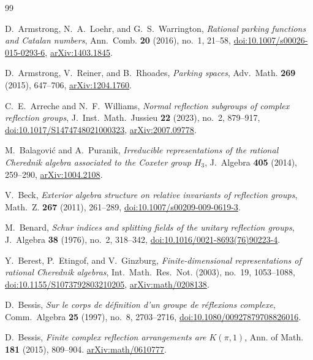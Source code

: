 \documentclass[10pt,a4paper]{amsart}
\theoremstyle{definition}
\begin{document}
\begingroup\raggedbottom
\begin{thebibliography}{99}
\raggedright
{}
D.~Armstrong, N.~A.~Loehr, and G.~S.~Warrington,
\emph{Rational parking functions and Catalan numbers},
Ann.~Comb. \textbf{20} (2016), no.~1, 21--58,
\href{https://doi.org/10.1007/s00026-015-0293-6}{doi:10.1007/s00026-015-0293-6},
\href{https://arxiv.org/abs/1403.1845}{arXiv:1403.1845}.

D.~Armstrong, V.~Reiner, and B.~Rhoades,
\emph{Parking spaces}, Adv.~Math. \textbf{269} (2015), 647--706,
\href{https://arxiv.org/abs/1204.1760}{arXiv:1204.1760}.

C.~E.~Arreche and N.~F.~Williams,
\emph{Normal reflection subgroups of complex reflection groups},
J.~Inst.~Math.~Jussieu \textbf{22} (2023), no.~2, 879--917,
\href{https://doi.org/10.1017/S1474748021000323}{doi:10.1017/S1474748021000323},
\href{https://arxiv.org/abs/2007.09778}{arXiv:2007.09778}.

M.~Balagovi\'c and A.~Puranik,
\emph{Irreducible representations of the rational Cherednik algebra
associated to the Coxeter group $H_3$},
J.~Algebra \textbf{405} (2014), 259--290,
\href{https://arxiv.org/abs/1004.2108}{arXiv:1004.2108}.

V.~Beck,
\emph{Exterior algebra structure on relative invariants of reflection groups},
Math.~Z. \textbf{267} (2011), 261--289,
\href{https://doi.org/10.1007/s00209-009-0619-3}{doi:10.1007/s00209-009-0619-3}.

M.~Benard,
\emph{Schur indices and splitting fields of the unitary reflection groups},
J.~Algebra \textbf{38} (1976), no.~2, 318--342,
\href{https://doi.org/10.1016/0021-8693(76)90223-4}{doi:10.1016/0021-8693(76)90223-4}.

Y.~Berest, P.~Etingof, and V.~Ginzburg,
\emph{Finite-dimensional representations of rational Cherednik algebras},
Int.~Math.~Res.~Not. (2003), no.~19, 1053--1088,
\href{https://doi.org/10.1155/S1073792803210205}{doi:10.1155/S1073792803210205},
\href{https://arxiv.org/abs/math/0208138}{arXiv:math/0208138}.

D.~Bessis,
\emph{Sur le corps de d\'efinition d'un groupe de r\'eflexions complexe},
Comm.~Algebra \textbf{25} (1997), no.~8, 2703--2716,
\href{https://doi.org/10.1080/00927879708826016}{doi:10.1080/00927879708826016}.

D.~Bessis,
\emph{Finite complex reflection arrangements are $K(\pi,1)$},
Ann. of Math. \textbf{181} (2015), 809--904.
\href{https://arxiv.org/abs/math/0610777}{arXiv:math/0610777}.


\end{thebibliography}
\end{document}
